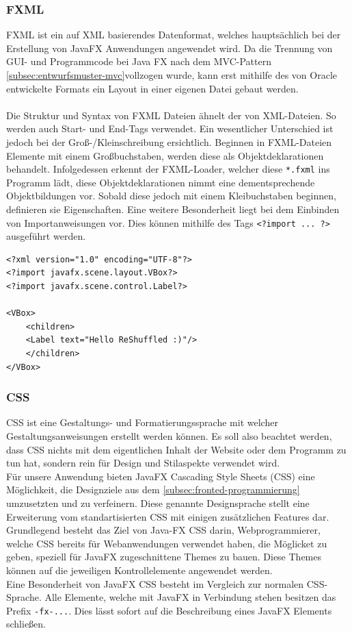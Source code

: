 \subsubsection{FXML}
FXML ist ein auf XML basierendes Datenformat, welches hauptsächlich bei der Erstellung von JavaFX Anwendungen angewendet wird.
Da die Trennung von GUI- und Programmcode bei Java FX nach dem MVC-Pattern \autoref{subsec:entwurfsmuster-mvc}vollzogen wurde, kann erst mithilfe des von Oracle entwickelte Formats ein Layout in einer eigenen Datei gebaut werden.\\\\
Die Struktur und Syntax von FXML Dateien ähnelt der von XML-Dateien.
So werden auch Start- und End-Tags verwendet.
Ein wesentlicher Unterschied ist jedoch bei der Groß-/Kleinschreibung ersichtlich.
Beginnen in FXML-Dateien Elemente mit einem Großbuchstaben, werden diese als Objektdeklarationen behandelt.
Infolgedessen erkennt der FXML-Loader, welcher diese \lstinline{*.fxml} ins Programm lädt, diese Objektdeklarationen nimmt eine dementsprechende Objektbildungen vor.
Sobald diese jedoch mit einem Kleibuchstaben beginnen, definieren sie Eigenschaften.
Eine weitere Besonderheit liegt bei dem Einbinden von Importanweisungen vor.
Dies können mithilfe des Tags \lstinline{<?import ... ?>} ausgeführt werden.\\
\begin{lstlisting}[style=XML,caption=FXML-Codebeispiel,label=fxmlExample]
<?xml version="1.0" encoding="UTF-8"?>
<?import javafx.scene.layout.VBox?>
<?import javafx.scene.control.Label?>

<VBox>
    <children>
    <Label text="Hello ReShuffled :)"/>
    </children>
</VBox>
\end{lstlisting}

\subsubsection{CSS}\label{sssec:CSS}
CSS ist eine Gestaltungs- und Formatierungssprache mit welcher Gestaltungsanweisungen erstellt werden können.
Es soll also beachtet werden, dass CSS nichts mit dem eigentlichen Inhalt der Website oder dem Programm zu tun hat, sondern rein für Design und Stilaspekte verwendet wird.\\
 Für unsere Anwendung bieten JavaFX Cascading Style Sheets (CSS) eine Möglichkeit, die Designziele aus dem \autoref{subsec:fronted-programmierung} umzusetzten und zu verfeinern.
Diese genannte Designsprache stellt eine Erweiterung vom standartisierten CSS mit einigen zusätzlichen Features dar.\\
Grundlegend besteht das Ziel von Java-FX CSS darin, Webprogrammierer, welche CSS bereits für Webanwendungen verwendet haben, die Möglicket zu geben, speziell für JavaFX zugeschnittene Themes zu bauen.
Diese Themes können auf die jeweiligen Kontrollelemente angewendet werden.\\
Eine Besonderheit von JavaFX CSS besteht im Vergleich zur normalen CSS-Sprache.
Alle Elemente, welche mit JavaFX in Verbindung stehen besitzen das Prefix \lstinline{-fx-...}.
Dies lässt sofort auf die Beschreibung eines JavaFX Elements schließen.
